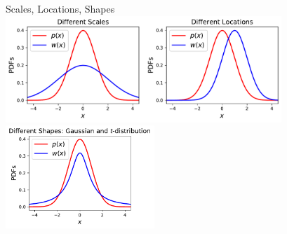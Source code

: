 
\begin{frame}{Scales, Locations, Shapes}
\centering
	\includegraphics[width=0.78\textwidth]{../../figs/2GaussianPDFs2Scales2Locations.pdf}
	\includegraphics[width=0.42\textwidth]{../../figs/diff_shapes_Gauss_t.pdf}
\end{frame}


